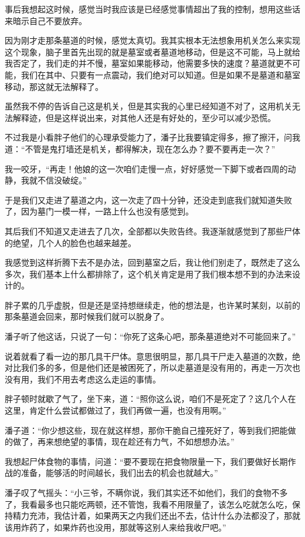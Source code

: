 事后我想起这时候，感觉当时我应该是已经感觉事情超出了我的控制，想用这些话来暗示自己不要放弃。

因为刚才走那条墓道的时候，感觉太真切。我其实根本无法想象用机关怎么来实现这个现象，脑子里首先出现的就是墓室或者墓道地移动，但是这不可能，马上就给我否定了，我们走的并不慢，墓室如果能移动，他需要多快的速度？墓道就更不可能，我们在其中、只要有一点震动，我们绝对可以知道。但是如果不是墓道和墓室移动，那这就无法解释了。

虽然我不停的告诉自己这是机关，但是其实我的心里已经知道不对了，这用机关无法解释迹，但是这样说出来，对其他人还是有好处的，至少可以减少恐慌。

不过我是小看胖子他们的心理承受能力了，潘子比我要镇定得多，擦了擦汗，问我道：“不管是鬼打墙还是机关，都得解决，现在怎么办？要不要再走一次？”

我一咬牙，“再走！他娘的这一次咱们走慢一点，好好感觉一下脚下或者四周的动静，我就不信没破绽。”

于是我们又走进了墓道之内，这一次走了四十分钟，还没走到底我们就知道失败了，因为墓门一模一样，一路上什么也没有感觉到。

其后我们不知道又走进去了几次，全部都以失败告终。我逐渐就感觉到了那些尸体的绝望，几个人的脸色也越来越差。

我感觉到这样折腾下去不是办法，回到墓室之后，我让他们别走了，既然走了这么多次，我们基本上什么都排除了，这个机关肯定是用了我们根本想不到的办法来设计的。

胖子累的几乎虚脱，但是还是坚持想继续走，他的想法是，也许某时某刻，以前的那条墓道会回来，那时候我们就可以脱身了。

潘子听了他这话，只说了一句：“你死了这条心吧，那条墓道绝对不可能回来了。”

说着就看了看一边的那几具干尸体。意思很明显，那几具干尸走入墓道的次数，绝对比我们多的多，但是他们还是被困死了，所以走墓道是没有用的，再走一万次也没有用，我们不用去考虑这么走运的事情。

胖子顿时就歇了气了，坐下来，道：“照你这么说，咱们不是死定了？这几个人在这里，肯定什么尝试都做过了，我们再做一遍，也没有用啊。”

潘子道：“你少想这些，现在就这样想，那你干脆自己撞死好了，等到我们把能做的做了，再来想绝望的事情，现在趁还有力气，不如想想办法。”

我想起尸体食物的事情，问道：“要不要现在把食物限量一下，我们要做好长期作战的准备，能够活的时间越长，我们出去的机会也就越大。”

潘子叹了气摇头：“小三爷，不瞒你说，我们其实还不如他们，我们的食物不多了，我看最多也只能吃两顿，还不管饱，我看不用限量了，该怎么吃就怎么吃，保持精力充沛，我估计着，如果两天之内我们还出不去，估计什么办法都没了，那就该用炸药了，如果炸药也没用，那就等这别人来给我收尸吧。”


